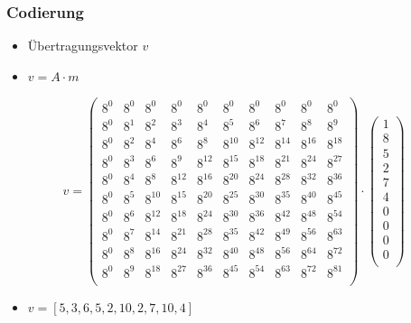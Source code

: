 \documentclass[11pt,aspectratio=169]{beamer}
\begin{document}
	\begin{frame}
		\frametitle{Codierung}
		
		\begin{itemize}
			\item Übertragungsvektor $v$
			
			\item $v = A \cdot m$
			
		\end{itemize}
		
		\[
		v = \begin{pmatrix}
			8^0&    8^0&    8^0&    8^0&    8^0&    8^0&    8^0&    8^0&    8^0&    8^0\\
			8^0&	8^1&	8^2&	8^3&	8^4&	8^5&	8^6&	8^7&    8^8&	8^9\\
			8^0&	8^2&	8^4&	8^6&	8^8& 8^{10}& 8^{12}& 8^{14}& 8^{16}& 8^{18}\\
			8^0&	8^3&	8^6&	8^9& 8^{12}& 8^{15}& 8^{18}& 8^{21}& 8^{24}& 8^{27}\\
			8^0&	8^4&	8^8& 8^{12}& 8^{16}& 8^{20}& 8^{24}& 8^{28}& 8^{32}& 8^{36}\\
			8^0&	8^5& 8^{10}& 8^{15}& 8^{20}& 8^{25}& 8^{30}& 8^{35}& 8^{40}& 8^{45}\\
			8^0&	8^6& 8^{12}& 8^{18}& 8^{24}& 8^{30}& 8^{36}& 8^{42}& 8^{48}& 8^{54}\\
			8^0&	8^7& 8^{14}& 8^{21}& 8^{28}& 8^{35}& 8^{42}& 8^{49}& 8^{56}& 8^{63}\\
			8^0&	8^8& 8^{16}& 8^{24}& 8^{32}& 8^{40}& 8^{48}& 8^{56}& 8^{64}& 8^{72}\\
			8^0&	8^9& 8^{18}& 8^{27}& 8^{36}& 8^{45}& 8^{54}& 8^{63}& 8^{72}& 8^{81}\\
		\end{pmatrix}
		\cdot
		\begin{pmatrix}
			1 \\ 8 \\ 5 \\ 2 \\ 7 \\ 4 \\ 0 \\ 0 \\ 0 \\ 0 \\
		\end{pmatrix}
		\]
		
		\begin{itemize}
			\item $v = [5,3,6,5,2,10,2,7,10,4]$
		\end{itemize}
		
	\end{frame}
\end{document}
